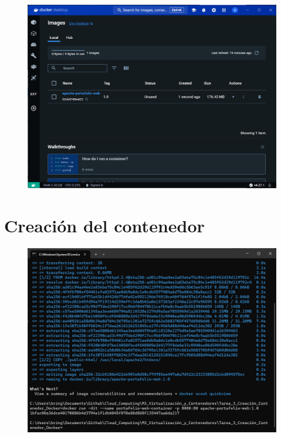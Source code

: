 \documentclass[12pt,a4paper]{article}
\begin{document}
\begin{figure}[H]
    \centering
    \includegraphics[width=1\linewidth]{M3_Virtualización_y_Contenedores/Tarea_3_Creación_Contenedor_Docker/reporte/figuras/3-2_Preparación_del_Contenedor.png}
    \label{fig:Preparación_Contenedor_2}
\end{figure}


\section{Creación del contenedor}

\begin{figure}[H]
    \centering
    \includegraphics[width=1\linewidth]{M3_Virtualización_y_Contenedores/Tarea_3_Creación_Contenedor_Docker/reporte/figuras/4-1_Creación_del_Contenedor.png}
    \label{fig:Creación_Contenedor_1}
\end{figure}
\end{document}
